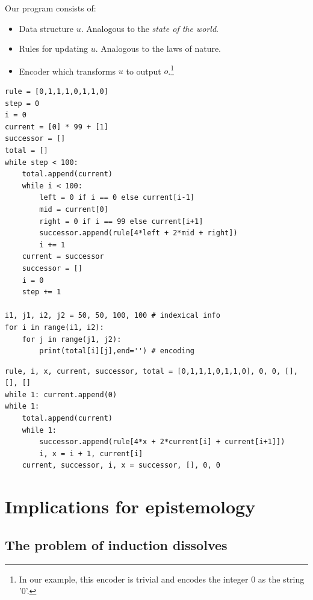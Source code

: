 \documentclass[oneside,hidelinks]{article}
\begin{document}
Our program consists of:
\begin{itemize}
\setlength\itemsep{0px}
\item Data structure $u$. Analogous to the \textit{state of the world}.
\item Rules for updating $u$. Analogous to the laws of nature.
\item Encoder which transforms $u$ to output $o$.\footnote{In our example, this encoder is trivial and encodes the integer 0 as the string '0'.}
\end{itemize}

\newpage

\begin{lstlisting}[caption={A short program implementing Rule 110, together with indexical info. It prints a quite chaotic looking string of length 2500.}]
rule = [0,1,1,1,0,1,1,0]
step = 0
i = 0
current = [0] * 99 + [1]
successor = []
total = []
while step < 100:
	total.append(current)
	while i < 100:
		left = 0 if i == 0 else current[i-1]
		mid = current[0]
		right = 0 if i == 99 else current[i+1]
		successor.append(rule[4*left + 2*mid + right])
		i += 1
	current = successor
	successor = []
	i = 0
	step += 1

i1, j1, i2, j2 = 50, 50, 100, 100 # indexical info
for i in range(i1, i2):
	for j in range(j1, j2):
		print(total[i][j],end='') # encoding
\end{lstlisting}

\begin{lstlisting}[caption={A short program generating an infinite universe of Rule 110. The question of how indexical information works in an infinite universe is addressed later in the document.}]
% todo where later?
rule, i, x, current, successor, total = [0,1,1,1,0,1,1,0], 0, 0, [], [], []
while 1: current.append(0)
while 1:
	total.append(current)
	while 1:
		successor.append(rule[4*x + 2*current[i] + current[i+1]])
		i, x = i + 1, current[i]
	current, successor, i, x = successor, [], 0, 0
\end{lstlisting}

\newpage

\section{Implications for epistemology}

\subsection{The problem of induction dissolves}
\end{document}
